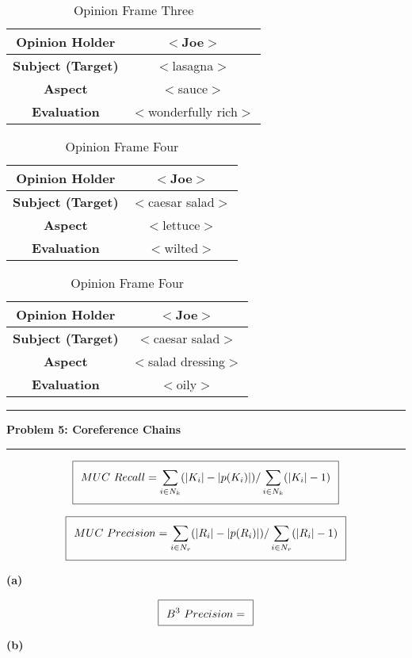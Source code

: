 \documentclass[11pt]{article}
\newcommand\question[2]{\vspace{.25in}\hrule\textbf{#1: #2}\vspace{.5em}\hrule\vspace{.10in}}
\renewcommand\part[1]{\vspace{.10in}\textbf{(#1)}}
\begin{document}
 \begin{table}[H]
\centering
{\renewcommand{\arraystretch}{1.2}%
\begin{tabular}{| c | c |}
\hline
\textbf{Opinion Holder} & $<$Joe$>$\\ \hline
\textbf{Subject (Target)} & $<$lasagna$>$ \\ \hline
\textbf{Aspect} & $<$sauce$>$ \\ \hline
\textbf{Evaluation} & $<$wonderfully rich$>$ \\ \hline
\end{tabular}}
\caption{Opinion Frame Three}
\end{table}

 \begin{table}[H]
\centering
{\renewcommand{\arraystretch}{1.2}%
\begin{tabular}{| c | c |}
\hline
\textbf{Opinion Holder} & $<$Joe$>$\\ \hline
\textbf{Subject (Target)} & $<$caesar salad$>$ \\ \hline
\textbf{Aspect} & $<$lettuce$>$ \\ \hline
\textbf{Evaluation} & $<$wilted$>$ \\ \hline
\end{tabular}}
\caption{Opinion Frame Four}
\end{table}

\begin{table}[H]
\centering
{\renewcommand{\arraystretch}{1.2}%
\begin{tabular}{| c | c |}
\hline
\textbf{Opinion Holder} & $<$Joe$>$\\ \hline
\textbf{Subject (Target)} & $<$caesar salad$>$ \\ \hline
\textbf{Aspect} & $<$salad dressing$>$ \\ \hline
\textbf{Evaluation} & $<$oily$>$ \\ \hline
\end{tabular}}
\caption{Opinion Frame Four}
\end{table}


\question{Problem 5}{Coreference Chains}

\begin{equation}
\setlength\fboxsep{0.25cm}
\setlength\fboxrule{0.4pt}
\boxed{MUC \ Recall = \sum_{i \in N_k} ( \vert K_i \vert - \vert p(K_i) \vert ) / \sum_{i \in N_k} ( \vert K_i \vert - 1)}
\end{equation}

\begin{equation}
\setlength\fboxsep{0.25cm}
\setlength\fboxrule{0.4pt}
\boxed{MUC \ Precision = \sum_{i \in N_r} ( \vert R_i \vert - \vert p(R_i) \vert ) / \sum_{i \in N_r} ( \vert R_i \vert - 1)}
\end{equation}

\part{a}

\begin{equation}
\setlength\fboxsep{0.25cm}
\setlength\fboxrule{0.4pt}
\boxed{B^3 \ Precision = }
\end{equation}

\part{b}
\end{document}
